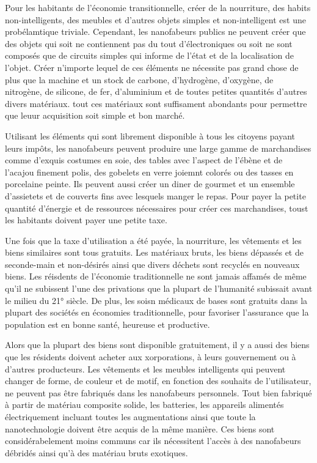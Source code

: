 Pour les habitants de l'économie transitionnelle, créer de la nourriture, des habits non-intelligents, des meubles et d'autres objets simples et non-intelligent est une probélamtique triviale. Cependant, les nanofabeurs publics ne peuvent créer que des objets qui soit ne contiennent pas du tout d'électroniques ou soit ne sont composés que de circuits simples qui informe de l'état et de la localisation de l'objet. Créer n'importe lequel de ces éléments ne nécessite pas grand chose de plus que la machine et un stock de carbone, d'hydrogène, d'oxygène, de nitrogène, de silicone, de fer, d'aluminium et de toutes petites quantités d'autres divers matériaux. tout ces matériaux sont suffisament abondants pour permettre que leuur acquisition soit simple et bon marché. 

Utilisant les éléments qui sont librement disponible à tous les citoyens payant leurs impôts, les nanofabeurs peuvent produire une large gamme de marchandises comme d'exquis costumes en soie, des tables avec l'aspect de l'ébène et de l'acajou finement polis, des gobelets en  verre joiemnt colorés ou des tasses en porcelaine peinte. Ils peuvent aussi créer un diner de gourmet et un ensemble d'assietets et de couverts fins avec lesquels manger le repas. Pour payer la petite quantité d'énergie et de ressources nécessaires pour créer ces marchandises, toust les habitants doivent payer une petite taxe. 

Une fois que la taxe d'utilisation a été payée, la nourriture, les vêtements et les biens similaires sont tous gratuits. Les matériaux bruts, les biens dépassés et de seconde-main et non-désirés ainsi que divers déchets sont recyclés en nouveaux biens. Les réisdents de l'économie traditionnelle ne sont jamais affamés de même qu'il ne subissent l'une des privations que la plupart de l'humanité subissait avant le milieu du 21° siècle. De plus, les soisn médicaux de bases sont gratuits dans la plupart des sociétés en économies traditionnelle, pour favoriser l'assurance que la population est en bonne santé, heureuse et productive. 

Alors que la plupart des biens sont disponible gratuitement, il y a aussi des biens que les résidents doivent acheter aux xorporations, à leurs gouvernement ou à d'autres producteurs. Les vêtements et les meubles intelligents qui peuvent changer de forme, de couleur et de motif, en fonction des souhaits de l'utilisateur, ne peuvent pas être fabriqués dans les nanofabeurs personnels. Tout bien fabriqué à partir de matériau composite solide, les batteries, les appareils alimentés électriquement incluant toutes les augmentations ainsi que toute la nanotechnologie doivent être acquis de la même manière. Ces biens sont considérabelement moins communs car ils nécessitent l'accès à des nanofabeurs débridés ainsi qu'à des matériau bruts exotiques. 

